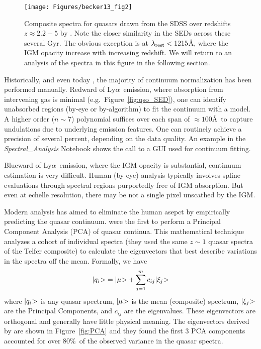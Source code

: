 \documentclass[graybox]{svmult}
\def\lya{Ly$\alpha$}
\def\ket#1{{|#1\negmedspace>}}
\def\smm{\sum\limits}
\begin{document}
%
\begin{figure}[b]
\sidecaption
\texttt{[image: Figures/becker13\_fig2]}
%
%
\caption{Composite spectra for quasars drawn
from the SDSS over redshifts $z \approx 2.2-5$
by \cite{becker+13}.  Note the closer similarity
in the SEDs across these several Gyr.  The obvious
exception is at $\lambda_{\rm rest} < 1215$\AA, where
the IGM opacity increase with increasing redshift. 
We will return to an analysis of the spectra in this
figure in the following section.
}
\label{fig:becker13_fig2}       %
\end{figure}

Historically, and even today \cite[e.g.]{kodiaq_dr1}, the majority of 
continuum normalization has been performed manually.  Redward
of \lya\ emission, where absorption from intervening gas is
minimal (e.g.\ Figure~\ref{fig:qso_SED}), one can identify
unabsorbed regions (by-eye or by-algorithm) to fit the
continuum with a model.  A higher order ($n \sim 7$)
polynomial suffices over each span of $\approx 100$\AA\ to
capture undulations due to underlying emission features.
One can routinely achieve a precision of several percent,
depending on the data quality.  An example in the 
{\it Spectral\_Analysis} Notebook shows the call to a 
GUI used for continuum fitting.

Blueward of \lya\ emission, where the IGM opacity is
substantial, continuum estimation is very difficult.
Human (by-eye) analysis typically involves spline evaluations
through spectral regions purportedly free of IGM absorption.
But even at echelle resolution, there may be not a single
pixel unscathed by the IGM.

Modern analysis has aimed to eliminate the human asepct
by empirically predicting the quasar continuum.  
\cite{suzuki06} were the first to perform a Principal
Component Analysis (PCA) of quasar continua.  This 
mathematical technique analyzes a cohort of individual
spectra (they used the same $z \sim 1$ quasar spectra
of the Telfer composite) to calculate the eigenvectors
that best describe variations in the spectra off the mean.
Formally, we have
\begin{equation}
\ket{q_i} = \ket{\mu} + \smm_{j=1}^{m} c_{ij} \ket{\xi_j}
\label{eqn:PCA}
\end{equation}
where $\ket{q_i}$ is any quasar spectrum,
$\ket{\mu}$ is the mean (composite) spectrum,
$\ket{\xi_j}$ are the Principal Components, and
$c_{ij}$ are the eigenvalues.
These eigenvectors are orthogonal and generally
have little physical meaning.  The eigenvectors
derived by \cite{suzuki06}
are shown in Figure~\ref{fig:PCA} and they found
the first 3 PCA components accounted for over
80\%\ of the observed variance in the quasar spectra.
\end{document}
